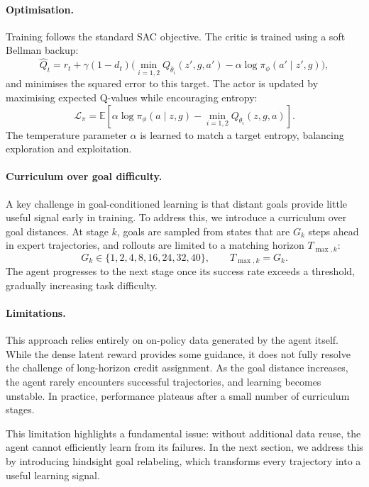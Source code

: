 \paragraph{Optimisation.}
Training follows the standard SAC objective. The critic is trained using
a soft Bellman backup:
\begin{equation}
\widehat{Q}_t = r_t + \gamma (1 - d_t)
\Big(\min_{i=1,2} Q_{\bar{\theta}_i}(z', g, a') - \alpha \log \pi_\phi(a' \mid z', g)\Big),
\end{equation}
and minimises the squared error to this target. The actor is updated by
maximising expected Q-values while encouraging entropy:
\begin{equation}
\mathcal{L}_\pi = \mathbb{E}\!\left[\alpha \log \pi_\phi(a \mid z,g)
- \min_{i=1,2} Q_{\theta_i}(z,g,a)\right].
\end{equation}
The temperature parameter $\alpha$ is learned to match a target entropy,
balancing exploration and exploitation.

\paragraph{Curriculum over goal difficulty.}
A key challenge in goal-conditioned learning is that distant goals
provide little useful signal early in training. To address this, we
introduce a curriculum over goal distances. At stage $k$, goals are
sampled from states that are $G_k$ steps ahead in expert trajectories,
and rollouts are limited to a matching horizon $T_{\max,k}$:
\begin{equation}
G_k \in \{1,2,4,8,16,24,32,40\}, \qquad T_{\max,k} = G_k.
\end{equation}
The agent progresses to the next stage once its success rate exceeds a
threshold, gradually increasing task difficulty.

\paragraph{Limitations.}
This approach relies entirely on on-policy data generated by the agent
itself. While the dense latent reward provides some guidance, it does not
fully resolve the challenge of long-horizon credit assignment. As the
goal distance increases, the agent rarely encounters successful
trajectories, and learning becomes unstable. In practice, performance
plateaus after a small number of curriculum stages.

This limitation highlights a fundamental issue: without additional data
reuse, the agent cannot efficiently learn from its failures. In the next
section, we address this by introducing hindsight goal relabeling, which
transforms every trajectory into a useful learning signal.

